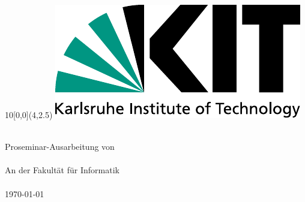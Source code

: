 
\newcommand{\diameter}{20}
\newcommand{\xone}{-15}
\newcommand{\xtwo}{160}
\newcommand{\yone}{15}
\newcommand{\ytwo}{-253}

\begin{titlepage}

\begin{textblock}{10}[0,0](4,2.5)
	\includegraphics[width=.3\textwidth]{logos/KITLogo_RGB.pdf}
\end{textblock}
\vspace*{3.5cm}
\begin{center}
	\Huge{\mytitle}
	\vspace*{2cm}\\
	\Large{
		Proseminar-Ausarbeitung von
	}\\
	\vspace*{1cm}
	\huge{\myname}\\
	\vspace*{1cm}
	\Large{
		An der Fakultät für Informatik
		\\
		\myinstitute
	}\\
	\vspace*{1cm}
	\Large{\today}
\end{center}
\vspace*{1cm}



\end{titlepage}
